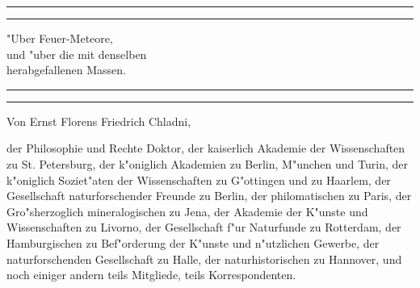 \documentclass[a4paper, 11pt, oneside, polutonikogreek, german]{article}
\begin{document}
\begin{titlepage} %
	\centering %

	
	\rule{\textwidth}{1.6pt}\vspace*{-\baselineskip}\vspace*{2pt} %
	\rule{\textwidth}{0.4pt} %
	
	\vspace{1\baselineskip} %
	
	{\Huge "Uber Feuer-Meteore,\\[1.25pt] und "uber die mit denselben\\[1.25pt] herabgefallenen Massen.\\[1.25pt]}
	
	\vspace{1\baselineskip} %

	\rule{\textwidth}{0.4pt}\vspace*{-\baselineskip}\vspace{3.2pt} %
	\rule{\textwidth}{1.6pt} %
	
	\vspace{1\baselineskip} %
	
	
	{\large Von Ernst Florens Friedrich Chladni,} %
	
	\vspace*{1\baselineskip} %
	
    {\normalsize der Philosophie und Rechte Doktor, der kaiserlich Akademie der Wissenschaften zu St. Petersburg, der k"oniglich Akademien zu Berlin, M"unchen und Turin, der k"oniglich Soziet"aten der Wissenschaften zu G"ottingen und zu Haarlem, der Gesellschaft naturforschender Freunde zu Berlin, der philomatischen zu Paris, der Gro"sherzoglich mineralogischen zu Jena, der Akademie der K"unste und Wissenschaften zu Livorno, der Gesellschaft f"ur Naturfunde zu Rotterdam, der Hamburgischen zu Bef"orderung der K"unste und n"utzlichen Gewerbe, der naturforschenden Gesellschaft zu Halle, der naturhistorischen zu Hannover, und noch einiger andern teils Mitgliede, teils Korrespondenten.} %
    

\end{titlepage}
\end{document}
